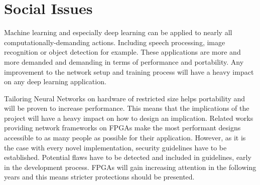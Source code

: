 
\section{Social Issues}

Machine learning and especially deep learning can be applied to nearly all computationally-demanding actions. Including speech processing, image recognition or object detection for example. These applications are more and more demanded and demanding in terms of performance and portability. Any improvement to the network setup and training process will have a heavy impact on any deep learning application.

Tailoring Neural Networks on hardware of restricted size helps portability and will be proven to increase performance. This means that the implications of the project will have a heavy impact on how to design an implication. Related works providing network frameworks on FPGAs \cite{Zhao2016, Colangelo2018, Jahanshahi2019} make the most performant designs accessible to as many people as possible for their application. However, as it is the case with every novel implementation, security guidelines have to be established. Potential flaws have to be detected and included in guidelines, early in the development process. FPGAs will gain increasing attention in the following years and this means stricter protections should be presented.
